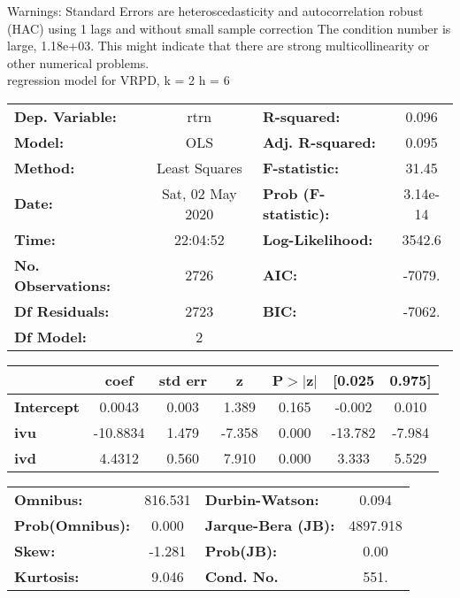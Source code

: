Warnings: \newline
 [1] Standard Errors are heteroscedasticity and autocorrelation robust (HAC) using 1 lags and without small sample correction \newline
 [2] The condition number is large, 1.18e+03. This might indicate that there are \newline
 strong multicollinearity or other numerical problems.\\ 

regression model for VRPD, k = 2 h = 6\begin{center}
\begin{tabular}{lclc}
\toprule
\textbf{Dep. Variable:}    &       rtrn       & \textbf{  R-squared:         } &     0.096   \\
\textbf{Model:}            &       OLS        & \textbf{  Adj. R-squared:    } &     0.095   \\
\textbf{Method:}           &  Least Squares   & \textbf{  F-statistic:       } &     31.45   \\
\textbf{Date:}             & Sat, 02 May 2020 & \textbf{  Prob (F-statistic):} &  3.14e-14   \\
\textbf{Time:}             &     22:04:52     & \textbf{  Log-Likelihood:    } &    3542.6   \\
\textbf{No. Observations:} &        2726      & \textbf{  AIC:               } &    -7079.   \\
\textbf{Df Residuals:}     &        2723      & \textbf{  BIC:               } &    -7062.   \\
\textbf{Df Model:}         &           2      & \textbf{                     } &             \\
\bottomrule
\end{tabular}
\begin{tabular}{lcccccc}
                   & \textbf{coef} & \textbf{std err} & \textbf{z} & \textbf{P$> |$z$|$} & \textbf{[0.025} & \textbf{0.975]}  \\
\midrule
\textbf{Intercept} &       0.0043  &        0.003     &     1.389  &         0.165        &       -0.002    &        0.010     \\
\textbf{ivu}       &     -10.8834  &        1.479     &    -7.358  &         0.000        &      -13.782    &       -7.984     \\
\textbf{ivd}       &       4.4312  &        0.560     &     7.910  &         0.000        &        3.333    &        5.529     \\
\bottomrule
\end{tabular}
\begin{tabular}{lclc}
\textbf{Omnibus:}       & 816.531 & \textbf{  Durbin-Watson:     } &    0.094  \\
\textbf{Prob(Omnibus):} &   0.000 & \textbf{  Jarque-Bera (JB):  } & 4897.918  \\
\textbf{Skew:}          &  -1.281 & \textbf{  Prob(JB):          } &     0.00  \\
\textbf{Kurtosis:}      &   9.046 & \textbf{  Cond. No.          } &     551.  \\
\bottomrule
\end{tabular}
\end{center}

